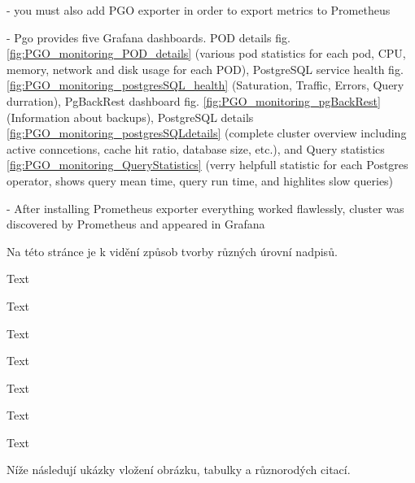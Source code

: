 - you must also add PGO exporter in order to export metrics to Prometheus

- Pgo provides five Grafana dashboards. POD details fig. \ref{fig:PGO_monitoring_POD_details} (various pod statistics for each pod, CPU, memory, network and disk usage for each POD),
PostgreSQL service health fig. \ref{fig:PGO_monitoring_postgresSQL_health} (Saturation, Traffic, Errors, Query durration),
PgBackRest dashboard fig. \ref{fig:PGO_monitoring_pgBackRest} (Information about backups),
PostgreSQL details \ref{fig:PGO_monitoring_postgresSQLdetails} (complete cluster overview including active conncetions, cache hit ratio, database size, etc.),
and Query statistics \ref{fig:PGO_monitoring_QueryStatistics} (verry helpfull statistic for each Postgres operator, shows query mean time, query run time, and highlites slow queries)

- After installing Prometheus exporter everything worked flawlessly, cluster was discovered by Prometheus and appeared in Grafana












Na této stránce je k vidění způsob tvorby různých úrovní nadpisů.

Text

Text

Text

Text

Text

Text

Text


Níže následují ukázky vložení obrázku, tabulky a různorodých citací.


